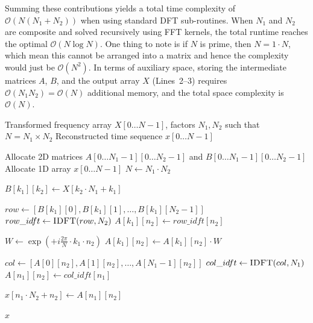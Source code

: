 \documentclass{article}
\begin{document}
Summing these contributions yields a total time complexity of $\mathcal{O}(N(N_1 + N_2))$ when using standard DFT sub-routines. When $N_1$ and $N_2$ are composite and solved recursively using FFT kernels, the total runtime reaches the optimal $\mathcal{O}(N \log N)$. One thing to note is if $N$ is prime, then $N = 1 \cdot N$, which mean this cannot be arranged into a matrix and hence the complexity would just be $\mathcal{O}(N^2)$. In terms of auxiliary space, storing the intermediate matrices $A$, $B$, and the output array $X$ (Lines~2--3) requires $\mathcal{O}(N_1 N_2) = \mathcal{O}(N)$ additional memory, and the total space complexity is $\mathcal{O}(N)$.
\begin{algorithm}[H]
\caption{Mixed-Radix IFFT}
\begin{algorithmic}[1]
\Require Transformed frequency array $X[0 \dots N-1]$, factors $N_1, N_2$ such that $N = N_1 \times N_2$
\Ensure Reconstructed time sequence $x[0 \dots N-1]$

    \State Allocate 2D matrices $A[0 \dots N_1-1][0 \dots N_2-1]$ and $B[0 \dots N_1-1][0 \dots N_2-1]$
    \State Allocate 1D array $x[0 \dots N-1]$
    \State $N \gets N_1 \cdot N_2$

            \State $B[k_1][k_2] \gets X[k_2 \cdot N_1 + k_1]$
        \EndFor
    \EndFor

        \State $row \gets [B[k_1][0], B[k_1][1], \dots, B[k_1][N_2-1]]$
        \State $row\_idft \gets \Call{IDFT}{row, N_2}$
            \State $A[k_1][n_2] \gets row\_idft[n_2]$
        \EndFor
    \EndFor

            \State $W \gets \exp\left(+i \frac{2\pi}{N} \cdot k_1 \cdot n_2\right)$ 
            \State $A[k_1][n_2] \gets A[k_1][n_2] \cdot W$
        \EndFor
    \EndFor

        \State $col \gets [A[0][n_2], A[1][n_2], \dots, A[N_1-1][n_2]]$
        \State $col\_idft \gets \Call{IDFT}{col, N_1}$
            \State $A[n_1][n_2] \gets col\_idft[n_1]$
        \EndFor
    \EndFor

            \State $x[n_1 \cdot N_2 + n_2] \gets A[n_1][n_2]$
        \EndFor
    \EndFor

    \State \Return $x$
\EndProcedure
\end{algorithmic}
\end{algorithm}
\end{document}
